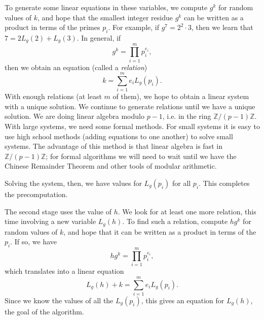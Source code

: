 \documentclass{article}
\theoremstyle{plain}
\theoremstyle{definition}
\theoremstyle{remark}
\numberwithin{theorem}{section}
\newcommand{\ZZ}{\mathbb{Z}}
\begin{document}
To generate some linear equations in these variables, we compute $g^k$ for random values of $k$, and hope that the smallest integer residue $g^k$ can be written as a product in terms of the primes $p_i$. For example, if $g^7 = 2^2 \cdot 3$, then we learn that $7 = 2 L_g(2) + L_g(3)$.  In general, if 
\[
	g^k = \prod_{i=1}^m p_i^{e_i},
\]
then we obtain an equation (called a \emph{relation})
\[
	k = \sum_{i=1}^m e_i L_g(p_i).
\]
With enough relations (at least $m$ of them), we hope to obtain a linear system with a unique solution.  We continue to generate relations until we have a unique solution.  We are doing linear algebra modulo $p-1$, i.e. in the ring $\ZZ/(p-1)\ZZ$.  With large systems, we need some formal methods.  For small systems it is easy to use high school methods (adding equations to one another) to solve small systems.  The advantage of this method is that linear algebra is fast in $\ZZ/(p-1)\ZZ$; for formal algorithms we will need to wait until we have the Chinese Remainder Theorem and other tools of modular arithmetic.

Solving the system, then, we have values for $L_g(p_i)$ for all $p_i$.  This completes the precomputation.

The second stage uses the value of $h$.  We look for at least one more relation, this time involving a new variable $L_g(h)$.  To find such a relation, compute $hg^k$ for random values of $k$, and hope that it can be written as a product in terms of the $p_i$.  If so, we have
\[
	hg^k = \prod_{i=1}^m p_i^{e_i},
\]
which translates into a linear equation
\[
	L_g(h) + k = \sum_{i=1}^m e_i L_g(p_i).
\]
Since we know the values of all the $L_g(p_i)$, this gives an equation for $L_g(h)$, the goal of the algorithm.
\end{document}
